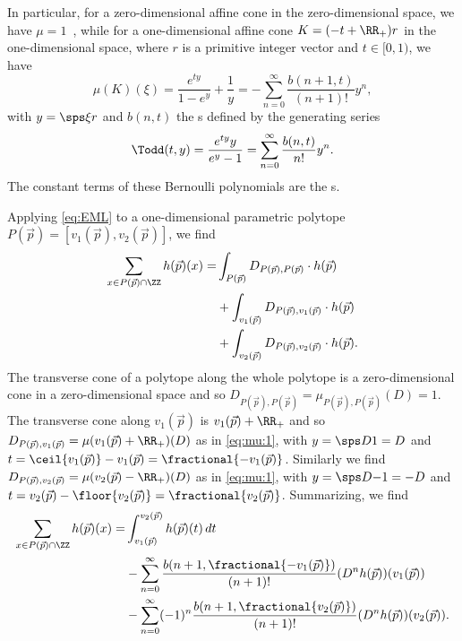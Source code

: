 In particular, for a zero-dimensional affine cone in the zero-dimensional
space, we have $\mu = 1$~\cite[Proposition 12]{Berline2006local},
while for a one-dimensional affine
cone $K = (-t + \RR_+) r$ in the one-dimensional space, where
$r$ is a primitive integer vector and $t \in [0,1)$,
we have~\cite[(13)]{Berline2006local}
\begin{equation}
\label{eq:mu:1}
\mu(K)(\xi) = \frac{e^{t y}}{1-e^y} + \frac 1{y}
= -\sum_{n=0}^\infty \frac{b(n+1, t)}{(n+1)!} y^n
,
\end{equation}
with $y = \sps \xi r$ and $b(n,t)$ the s
defined by the generating series
\begin{equation}
\label{eq:bernoulli}
\Todd(t,y) =
\frac{e^{ty} y}{e^y - 1} = \sum_{n=0}^\infty \frac{b(n,t)}{n!} y^n
.
\end{equation}
The constant terms of these Bernoulli polynomials
are the s.

Applying \eqref{eq:EML} to a one-dimensional parametric polytope
$P(\vec p) = [v_1(\vec p), v_2(\vec p)]$, we find
$$
\begin{aligned}
\sum_{x \in P(\vec p) \cap \ZZ} h(\vec p)(x)
= & \int_{P(\vec p)} D_{P(\vec p), P(\vec p)} \cdot h(\vec p)
\\
& + \int_{v_1(\vec p)} D_{P(\vec p), v_1(\vec p)} \cdot h(\vec p)
\\
& + \int_{v_2(\vec p)} D_{P(\vec p), v_2(\vec p)} \cdot h(\vec p)
.
\end{aligned}
$$
The transverse cone of a polytope along the whole polytope is
a zero-dimensional cone in a zero-dimensional space and so
$D_{P(\vec p), P(\vec p)} = \mu_{P(\vec p), P(\vec p)}(D) = 1$.
The transverse cone along $v_1(\vec p)$ is $v_1(\vec p) + \RR_+$
and so $D_{P(\vec p), v_1(\vec p)} = \mu(v_1(\vec p) + \RR_+)(D)$
as in \eqref{eq:mu:1}, with $y = \sps D 1 = D$ and
$t = \ceil{v_1(\vec p)} - v_1(\vec p) =
\fractional{-v_1(\vec p)}$.
Similarly we find
$D_{P(\vec p), v_2(\vec p)} = \mu(v_2(\vec p) - \RR_+)(D)$
as in \eqref{eq:mu:1}, with $y = \sps D {-1} = -D$ and
$t = v_2(\vec p) - \floor{v_2(\vec p)} =
\fractional{v_2(\vec p)}$.
Summarizing, we find
$$
\begin{aligned}
\sum_{x \in P(\vec p) \cap \ZZ} h(\vec p)(x)
= & \int_{v_1(\vec p)}^{v_2(\vec p)} h(\vec p)(t) \, dt
\\
& -\sum_{n=0}^\infty \frac{b(n+1, \fractional{-v_1(\vec p)})}{(n+1)!}
	(D^n h(\vec p))(v_1(\vec p))
\\
& -\sum_{n=0}^\infty (-1)^n \frac{b(n+1, \fractional{v_2(\vec p)})}{(n+1)!}
	(D^n h(\vec p))(v_2(\vec p))
.
\end{aligned}
$$

